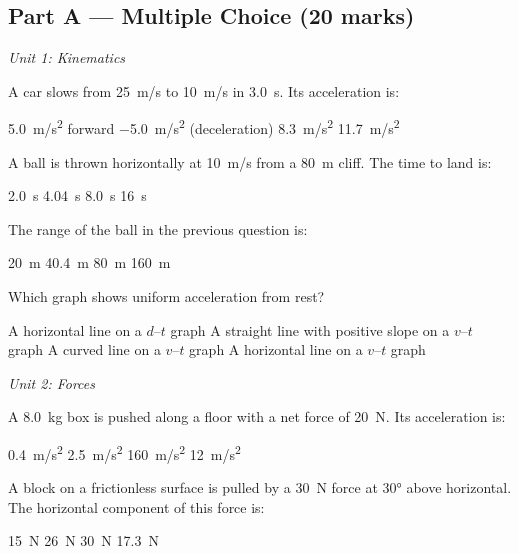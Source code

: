 \documentclass[addpoints]{exam}
\begin{document}
\newpage
\begin{questions}

\section*{Part A --- Multiple Choice (20 marks)}
\vspace{3mm}
\noindent\textit{Unit 1: Kinematics}
\vspace{3mm}

\question[1] A car slows from \SI{25}{m/s} to \SI{10}{m/s} in \SI{3.0}{s}. Its acceleration is:
\begin{choices}
    \choice \SI{5.0}{m/s^2} forward
    \correctchoice \SI{-5.0}{m/s^2} (deceleration)
    \choice \SI{8.3}{m/s^2}
    \choice \SI{11.7}{m/s^2}
\end{choices}

\question[1] A ball is thrown horizontally at \SI{10}{m/s} from a \SI{80}{m} cliff.
The time to land is:
\begin{choices}
    \choice \SI{2.0}{s}
    \correctchoice \SI{4.04}{s}
    \choice \SI{8.0}{s}
    \choice \SI{16}{s}
\end{choices}

\question[1] The range of the ball in the previous question is:
\begin{choices}
    \choice \SI{20}{m}
    \correctchoice \SI{40.4}{m}
    \choice \SI{80}{m}
    \choice \SI{160}{m}
\end{choices}

\question[1] Which graph shows uniform acceleration from rest?
\begin{choices}
    \choice A horizontal line on a $d$--$t$ graph
    \correctchoice A straight line with positive slope on a $v$--$t$ graph
    \choice A curved line on a $v$--$t$ graph
    \choice A horizontal line on a $v$--$t$ graph
\end{choices}

\vspace{3mm}
\noindent\textit{Unit 2: Forces}
\vspace{3mm}

\question[1] A \SI{8.0}{kg} box is pushed along a floor with a net force of \SI{20}{N}.
Its acceleration is:
\begin{choices}
    \choice \SI{0.4}{m/s^2}
    \correctchoice \SI{2.5}{m/s^2}
    \choice \SI{160}{m/s^2}
    \choice \SI{12}{m/s^2}
\end{choices}

\question[1] A block on a frictionless surface is pulled by a \SI{30}{N} force at
\ang{30} above horizontal. The horizontal component of this force is:
\begin{choices}
    \choice \SI{15}{N}
    \correctchoice \SI{26}{N}
    \choice \SI{30}{N}
    \choice \SI{17.3}{N}
\end{choices}


\end{questions}
\end{document}
